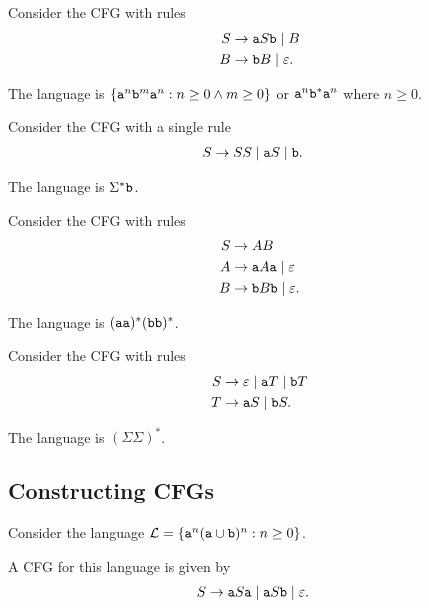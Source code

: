 \documentclass{notes}
\begin{document}
\begin{eg}
  Consider the CFG with rules 
  \begin{align*}
    S &\to \verb~a~ S \verb~b~ \; | \; B \\ 
    B &\to \verb~b~ B \; | \; \varepsilon.
  \end{align*}
  
  The language is $\left \{ \verb~a~^n \verb~b~^m \verb~a~^n : n \geq 0 \land m \geq 0 \right \}$ or $\verb~a~^n \verb~b~^* \verb~a~^n$ where $n \geq 0$.
\end{eg}

\begin{eg}
  Consider the CFG with a single rule 
  \begin{align*}
    S &\to SS \; | \; \verb~a~ S \; | \; \verb~b~.
  \end{align*}
  
  The language is $\Sigma^* \verb~b~$.
\end{eg}

\begin{eg}
  Consider the CFG with rules 
  \begin{align*}
    S &\to AB \\ 
    A &\to \verb~a~ A \verb~a~ \; | \; \varepsilon \\ 
    B &\to \verb~b~ B \verb~b~ \; | \; \varepsilon.
  \end{align*}
  
  The language is $(\verb~aa~)^* (\verb~bb~)^*$.
\end{eg}

\begin{eg}
  Consider the CFG with rules 
  \begin{align*}
    S &\to \varepsilon \; | \; \verb~a~ T \; | \; \verb~b~ T \\ 
    T &\to \verb~a~ S \; | \; \verb~b~ S.
  \end{align*}
  
  The language is $(\Sigma \Sigma)^*$.
\end{eg}

\newpage

\subsection{Constructing CFGs}

\begin{eg}
  Consider the language $\mathcal L = \left \{ \verb~a~^n (\verb~a~ \cup \verb~b~)^n : n \geq 0 \right \}$.
  
  A CFG for this language is given by
  \begin{align*}
    S &\to \verb~a~ S \verb~a~ \; | \; \verb~a~ S \verb~b~ \; | \; \varepsilon.
  \end{align*}
\end{eg}
\end{document}
